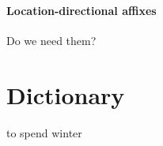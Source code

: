 \documentclass[11pt]{article}
\begin{document}
\paragraph{Location-directional affixes} Do we need them?

\section{Dictionary}
\begin{multicols}{2}
  \begin{description}
  \item [inha]
  	\begin{enumerate*}
  		 {to spend winter}
  	\end{enumerate*}
  
  \end{description}
\end{multicols}
\end{document}
